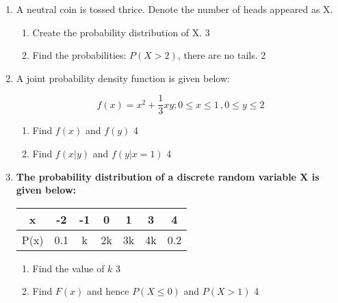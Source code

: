 \documentclass[10pt]{article}
\begin{document}
\begin{enumerate}

\item A neutral coin is tossed thrice. Denote the number of heads appeared as X. 

\begin{enumerate}
\item Create the probability distribution of X. \hfill 3
\item Find the probabilities: $P(X>2)$, there are no tails. \hfill 2
\end{enumerate}

\item A joint probability density function is given below:

\[f(x) = x^2+ \frac13 xy; 0\le x \le 1\,, 0\le y \le 2\]

\begin{enumerate}

\item Find $f(x)$ and $f(y)$ \hfill 4
\item Find $f(x|y)$ and $f(y|x=1)$ \hfill 4

\end{enumerate}

\item \textbf{The probability distribution of a discrete random variable X is given below:} 

	  \begin{table}[h]
	  \begin{center}
\begin{tabular}{c|cccccc}
x    & -2   & -1 & 0   & 1 & 3 & 4   \\ \hline
P(x) & 0.1 & k & 2k & 3k & 4k & 0.2
\end{tabular} 
\end{center}	
\end{table}

\begin{enumerate}

\item Find the value of $k$ \hfill 3
\item Find $F(x)$ and hence $P(X \le 0)$ and $P(X > 1)$ \hfill 4

\end{enumerate}

\end{enumerate}
\end{document}
